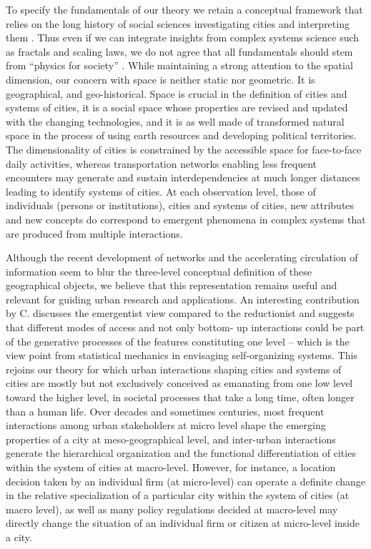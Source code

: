 \documentclass[10pt,letterpaper]{article}
\begin{document}
To specify the fundamentals of our theory we retain a conceptual framework that relies on the long history of social sciences investigating cities and interpreting them \citep{pumain1996theoriser}. Thus even if we can integrate insights from complex systems science such as fractals and scaling laws, we do not agree that all fundamentals should stem from ``physics for society'' \citep{caldarelli2018physics}. While maintaining a strong attention to the spatial dimension, our concern with space is neither static nor geometric. It is geographical, and geo-historical. Space is crucial in the definition of cities and systems of cities, it is a social space whose properties are revised and updated with the changing technologies, and it is as well made of transformed natural space in the process of using earth resources and developing political territories. The dimensionality of cities is constrained by the accessible space for face-to-face daily activities, whereas transportation networks enabling less frequent encounters may generate and sustain interdependencies at much longer distances leading to identify systems of cities. At each observation level, those of individuals (persons or institutions), cities and systems of cities, new attributes and new concepts do correspond to emergent phenomena in complex systems that are produced from multiple interactions.

Although the recent development of networks and the accelerating circulation of information seem to blur the three-level conceptual definition of these geographical objects, we believe that this representation remains useful and relevant for guiding urban research and applications. An interesting contribution by C. \cite{roth2006reconstruction} discusses the emergentist view compared to the reductionist and suggests that different modes of access and not only bottom- up interactions could be part of the generative processes of the features constituting one level – which is the view point from statistical mechanics in envisaging self-organizing systems. This rejoins our theory for which urban interactions shaping cities and systems of cities are mostly but not exclusively conceived as emanating from one low level toward the higher level, in societal processes that take a long time, often longer than a human life. Over decades and sometimes centuries, most frequent interactions among urban stakeholders at micro level shape the emerging properties of a city at meso-geographical level, and inter-urban interactions generate the hierarchical organization and the functional differentiation of cities within the system of cities at macro-level. However, for instance, a location decision taken by an individual firm (at micro-level) can operate a definite change in the relative specialization of a particular city within the system of cities (at macro level), as well as many policy regulations decided at macro-level may directly change the situation of an individual firm or citizen at micro-level inside a city.
\end{document}
